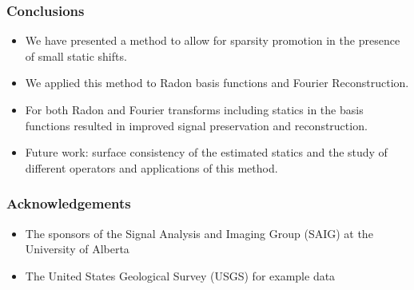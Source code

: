 \begin{frame} \frametitle{Conclusions}
    \begin{itemize}
        \item We have presented a method to allow for sparsity promotion in the presence of small static shifts.
	\item We applied this method to Radon basis functions and Fourier Reconstruction.
	\item For both Radon and Fourier transforms including statics in the basis functions resulted in improved signal preservation and reconstruction.
	\item Future work: surface consistency of the estimated statics and the study of different operators and applications of this method.
    \end{itemize}
\end{frame}

\begin{frame} \frametitle{Acknowledgements}
    \begin{itemize}
        \item The sponsors of the Signal Analysis and Imaging Group (SAIG) at the University of Alberta
	\item The United States Geological Survey (USGS) for example data
    \end{itemize}
\end{frame}


